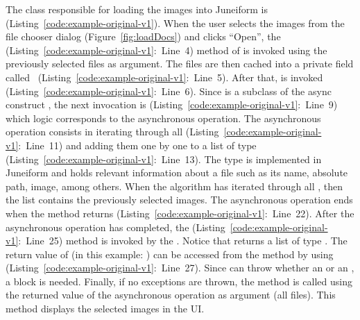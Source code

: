 \documentclass[type=bsc,accentcolor=tud9c]{tudthesis}
\begin{document}
The class responsible for loading the images into Juneiform is  (Listing~\ref{code:example-original-v1}). When the user selects the images from the file chooser dialog (Figure~\ref{fig:loadDocs}) and clicks ``Open'', the  (Listing~\ref{code:example-original-v1}:~Line~4) method of  is invoked using the previously selected files as argument. The files are then cached into a private field called ~(Listing~\ref{code:example-original-v1}:~Line~5). After that,  is invoked (Listing~\ref{code:example-original-v1}:~Line~6). Since  is a subclass of the async construct , the next invocation is  (Listing~\ref{code:example-original-v1}:~Line~9) which logic corresponds to the asynchronous operation. The asynchronous operation consists in iterating through all  (Listing~\ref{code:example-original-v1}:~Line~11) and adding them one by one to a list  of type  (Listing~\ref{code:example-original-v1}:~Line~13). The type  is implemented in Juneiform and holds relevant information about a file such as its name, absolute path, image, among others. When the algorithm has iterated through all , then the list  contains the previously selected images. The asynchronous operation ends when the method  returns (Listing~\ref{code:example-original-v1}:~Line~22). After the asynchronous operation has completed, the  (Listing~\ref{code:example-original-v1}:~Line~25) method is invoked by the . Notice that  returns a list of type . The return value of  (in this example: ) can be accessed from the method  by using  (Listing~\ref{code:example-original-v1}:~Line~27). Since  can throw whether an  or an , a  block is needed. Finally, if no exceptions are thrown, the  method is called using the returned value of the asynchronous operation as argument (all files). This method displays the selected images in the UI.
\end{document}

